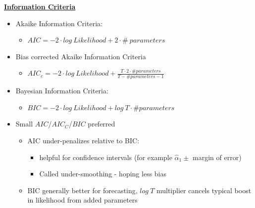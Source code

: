 \textbf{\underline{Information Criteria}}
\begin{itemize}
    \item Akaike Information Criteria:
    \begin{itemize}
        \item $AIC=-2\cdot log\ Likelihood+2\cdot \# \ parameters$
    \end{itemize}
    \item Bias corrected Akaike Information Criteria 
    \begin{itemize}
        \item $AIC_c=-2\cdot log\ Likelihood + \frac{T\cdot 2\cdot \# parameters}{T-\#parameters-1}$
    \end{itemize}
    \item Bayesian Information Criteria:
    \begin{itemize}
        \item $BIC=-2\cdot log\ Likelihood+log\ T\cdot \# parameters$
    \end{itemize}
    \item[] Small $AIC$/$AIC_C$/$BIC$ preferred
    \begin{itemize}
        \item AIC under-penalizes relative to BIC:
        \begin{itemize}
            \item helpful for confidence intervals (for example $\hat{\alpha}_1\pm $ margin of error)
            \item Called under-smoothing - hoping less bias
        \end{itemize}
        \item BIC generally better for forecasting, $log\ T$ multiplier cancels typical boost in likelihood from added parameters
    \end{itemize}
\end{itemize}

